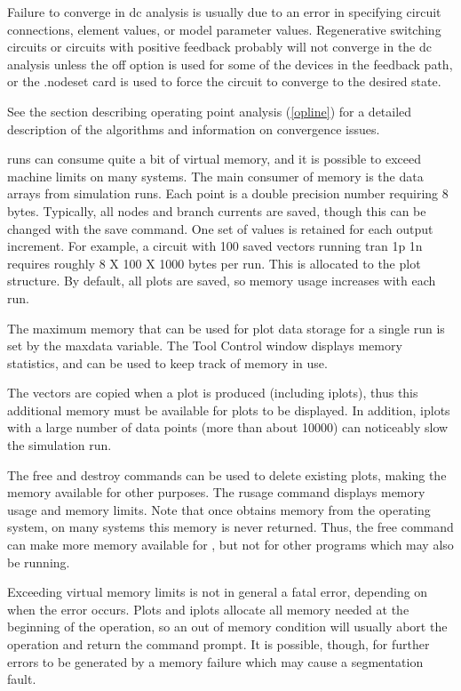 Failure to converge in dc analysis is usually due to an error in
specifying circuit connections, element values, or model parameter
values.  Regenerative switching circuits or circuits with positive
feedback probably will not converge in the dc analysis unless the {\vt off}
option is used for some of the devices in the feedback path, or the
{\vt .nodeset} card is used to force the circuit to converge to the desired
state.

See the section describing operating point analysis (\ref{opline})
for a detailed description of the algorithms and information on
convergence issues.


{\WRspice} runs can consume quite a bit of virtual memory, and it is
possible to exceed machine limits on many systems.  The main consumer
of memory is the data arrays from simulation runs.  Each point is a
double precision number requiring 8 bytes.  Typically, all nodes and
branch currents are saved, though this can be changed with the {\cb
save} command.  One set of values is retained for each output
increment.  For example, a circuit with 100 saved vectors running {\vt
tran 1p 1n} requires roughly 8 X 100 X 1000 bytes per run.  This is
allocated to the plot structure.  By default, all plots are saved, so
memory usage increases with each run.

The maximum memory that can be used for plot data storage for a single
run is set by the {\et maxdata} variable.  The {\cb Tool Control}
window displays memory statistics, and can be used to keep track of
memory in use.

The vectors are copied when a plot is produced (including iplots),
thus this additional memory must be available for plots to be
displayed.  In addition, iplots with a large number of data points
(more than about 10000) can noticeably slow the simulation run.

The {\cb free} and {\cb destroy} commands can be used to delete
existing plots, making the memory available for other purposes.  The
{\cb rusage} command displays memory usage and memory limits.  Note
that once {\WRspice} obtains memory from the operating system, on many
systems this memory is never returned.  Thus, the {\cb free} command
can make more memory available for {\WRspice}, but not for other
programs which may also be running.

Exceeding virtual memory limits is not in general a fatal error,
depending on when the error occurs.  Plots and iplots allocate all
memory needed at the beginning of the operation, so an out of memory
condition will usually abort the operation and return the command
prompt.  It is possible, though, for further errors to be generated by
a memory failure which may cause a segmentation fault.


